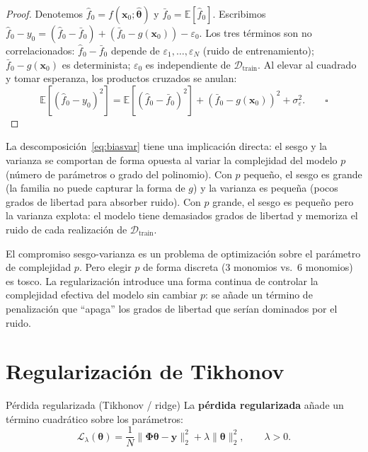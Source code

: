 \begin{proof}
Denotemos $\hat{f}_0 = f(\bm{x}_0;\hat{\bm{\theta}})$ y
$\bar{f}_0 = \mathbb{E}[\hat{f}_0]$. Escribimos
$\hat{f}_0 - y_0 = (\hat{f}_0 - \bar{f}_0) + (\bar{f}_0 -
g(\bm{x}_0)) - \varepsilon_0$.
Los tres términos son no correlacionados: $\hat{f}_0 - \bar{f}_0$
depende de $\varepsilon_1, \ldots, \varepsilon_N$ (ruido de
entrenamiento); $\bar{f}_0 - g(\bm{x}_0)$ es determinista;
$\varepsilon_0$ es independiente de $\mathcal{D}_{\text{train}}$.
Al elevar al cuadrado y tomar esperanza, los productos cruzados se
anulan:
\[
  \mathbb{E}[(\hat{f}_0-y_0)^2]
  = \mathbb{E}[(\hat{f}_0-\bar{f}_0)^2]
  + (\bar{f}_0-g(\bm{x}_0))^2
  + \sigma_\varepsilon^2.
  \qquad\square
\]
\end{proof}

La descomposición~\eqref{eq:biasvar} tiene una implicación directa: el
sesgo y la varianza se comportan de forma opuesta al variar la
complejidad del modelo $p$ (número de parámetros o grado del polinomio).
Con $p$ pequeño, el sesgo es grande (la familia no puede capturar la
forma de $g$) y la varianza es pequeña (pocos grados de libertad para
absorber ruido). Con $p$ grande, el sesgo es pequeño pero la varianza
explota: el modelo tiene demasiados grados de libertad y memoriza el
ruido de cada realización de $\mathcal{D}_{\text{train}}$.

El compromiso sesgo-varianza es un problema de optimización sobre el
parámetro de complejidad $p$. Pero elegir $p$ de forma discreta
(3 monomios vs.\ 6 monomios) es tosco. La regularización introduce una
forma continua de controlar la complejidad efectiva del modelo sin
cambiar $p$: se añade un término de penalización que ``apaga'' los
grados de libertad que serían dominados por el ruido.

\section{Regularización de Tikhonov}
\label{sec:tikhonov}


\begin{definicion}{Pérdida regularizada (Tikhonov / ridge)}
\label{def:tikhonov}
La \textbf{pérdida regularizada} añade un término cuadrático sobre los
parámetros:
\begin{equation}
  \mathcal{L}_\lambda(\bm{\theta})
  = \frac{1}{N}\|\bm{\Phi}\bm{\theta}-\bm{y}\|_2^2
  + \lambda\|\bm{\theta}\|_2^2,
  \qquad \lambda > 0.
  \label{eq:tikhonov}
\end{equation}
\end{definicion}

